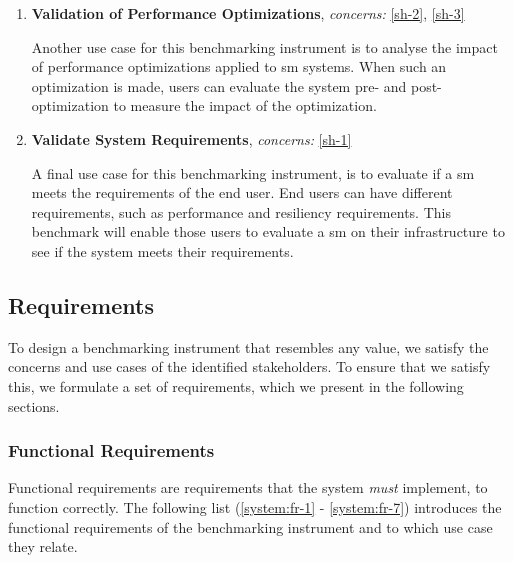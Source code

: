 \begin{enumerate}[label=\textbf{UC\arabic*}, leftmargin=3\parindent]
    
    \item \textbf{Validation of Performance Optimizations}, \textit{concerns:} \ref{sh-2}, \ref{sh-3}
    \label{u-4}

    Another use case for this benchmarking instrument is to analyse the impact of performance optimizations applied to \gls{sm} systems. When such an optimization is made, users can evaluate the system pre- and post-optimization to measure the impact of the optimization.
    

    \item \textbf{Validate System Requirements}, \textit{concerns:} \ref{sh-1}
    \label{u-5}
    
    A final use case for this benchmarking instrument, is to evaluate if a \gls{sm} meets the requirements of the end user. End users can have different requirements, such as performance and resiliency requirements. This benchmark will enable those users to evaluate a \gls{sm} on their infrastructure to see if the system meets their requirements.
    
\end{enumerate}

\subsection{Requirements}
\label{sec:system:requirements-analysis:requirements}

To design a benchmarking instrument that resembles any value, we satisfy the concerns and use cases of the identified stakeholders. To ensure that we satisfy this, we formulate a set of requirements, which we present in the following sections.

\subsubsection{Functional Requirements}
\label{sec:system:requirements-analysis:functional}

Functional requirements are requirements that the system \textit{must} implement, to function correctly. The following list (\ref{system:fr-1} - \ref{system:fr-7}) introduces the functional requirements of the benchmarking instrument and to which use case they relate.

